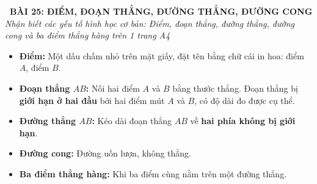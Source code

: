 \documentclass[11pt,a4paper]{article}
\begin{document}
\begin{tcolorbox}[
  enhanced,
  colback=violet!8!white,
  colframe=violet!70!black,
  arc=3mm, boxrule=1.2pt,
  left=3mm, right=3mm, top=2mm, bottom=2mm,
  halign=center
]
  {\LARGE\bfseries\color{violet!90!black}\faBookmark\ BÀI 25: ĐIỂM, ĐOẠN THẲNG, ĐƯỜNG THẲNG, ĐƯỜNG CONG}\\[1mm]
  {\itshape\footnotesize\color{black!75} Nhận biết các yếu tố hình học cơ bản: Điểm, đoạn thẳng, đường thẳng, đường cong và ba điểm thẳng hàng trên 1 trang A4}
\end{tcolorbox}

\vspace{-2mm}

\noindent
\begin{minipage}[t]{0.49\textwidth}\vspace{0pt}
\begin{tcolorbox}[
  enhanced,
  colback=violet!4!white,
  colframe=violet!75!black,
  arc=2mm, boxrule=0.8pt,
  left=2mm, right=2mm, top=1.8mm, bottom=1.8mm,
  title={\footnotesize\bfseries\color{white}\faKey\ 1. Điểm, đoạn thẳng, đường thẳng}
]
{\footnotesize
\begin{itemize}\setlength{\itemsep}{1pt}\setlength{\leftskip}{-2.5mm}
  \item \textbf{Điểm:} Một dấu chấm nhỏ trên mặt giấy, đặt tên bằng chữ cái in hoa: điểm $A$, điểm $B$.
  \item \textbf{Đoạn thẳng $AB$:} Nối hai điểm $A$ và $B$ bằng thước thẳng. Đoạn thẳng bị \textbf{giới hạn ở hai đầu} bởi hai điểm mút $A$ và $B$, có độ dài đo được cụ thể.
  \item \textbf{Đường thẳng $AB$:} Kéo dài đoạn thẳng $AB$ về \textbf{hai phía không bị giới hạn}.
  \item \textbf{Đường cong:} Đường uốn lượn, không thẳng.
  \item \textbf{Ba điểm thẳng hàng:} Khi ba điểm cùng nằm trên một đường thẳng.
\end{itemize}
}
\end{tcolorbox}
\end{minipage}
\hfill
\end{document}

